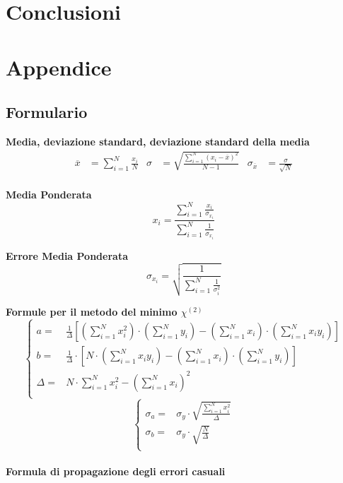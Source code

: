 \documentclass[a4paper,11pt,oneside]{article}
\begin{document}
\section{Conclusioni}
\section{Appendice}
\subsection{Formulario}
\textbf{Media, deviazione standard, deviazione standard della media}
\begin{align*}
        \overline{x}&=\sum\limits_{i=1}^{N} \frac{x_{i}}{N}&
        \sigma&=\sqrt{\frac{\sum\limits_{i=1}^{N} (x_{i}-\overline{x})^2}{N-1}}&
        \sigma_{\overline{x}}&=\frac{\sigma}{\sqrt{N}}
\end{align*}\\

\textbf{Media Ponderata}
\begin{equation*}
\label{eq:media_pond}
    x_i=\frac{\sum_{i=1}^{N}\frac{x_i}{\sigma_{x_i}}}{\sum_{i=1}^{N}\frac{1}{\sigma_{x_i}}}
\end{equation*}

\textbf{Errore Media Ponderata}
\begin{equation*}
\label{eq:errore_media_pond}
     \sigma_{x_i}=\sqrt{\frac{1}{\sum_{i=1}^{N}\frac{1}{\sigma_{i}^{2}}}}
\end{equation*}

\textbf{Formule per il metodo del minimo ${\chi}^{(2)}$}
\begin{equation*}
        \begin{cases}
    a=&\frac{1}{\Delta}[(\sum\limits_{i=1}^{N}{x_{i}^{2}})\cdot(\sum\limits_{i=1}^{N}{y_{i}})-(\sum\limits_{i=1}^{N}{x_{i}})\cdot(\sum\limits_{i=1}^{N}{x_{i}y_{i}})] \\ 
    b=&\frac{1}{\Delta }\cdot \left [N\cdot \left ( \sum\limits_{i=1}^{N}x_i y_i \right )-\left ( \sum\limits_{i=1}^{N}x_i \right )\cdot \left ( \sum\limits_{i=1}^{N}y_i \right )  \right ]\\
    \Delta=& N\cdot \sum\limits_{i=1}^{N} x_i^{2} - \left ( \sum\limits_{i=1}^{N}x_i \right )^{2}\\
    \end{cases}
\end{equation*}
\begin{equation*}
    \begin{cases}
    \sigma_{a}=&\sigma_{y}\cdot\sqrt{\frac{\sum_{i=1}^{N}{x_{i}^{2}}}{\Delta}} \\
    \sigma_{b}=&\sigma_y\cdot \sqrt{\frac{N}{\Delta }}\\
    \end{cases}
    \label{equation:err_chi_quadro}
\end{equation*}
\\
\textbf{Formula di propagazione degli errori casuali}\\
\end{document}
